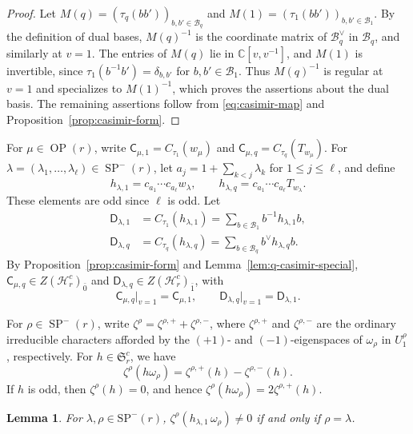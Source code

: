 \documentclass[11pt]{amsart}
\numberwithin{equation}{section}
\theoremstyle{plain}
\newtheorem{lem}[thm]{Lemma}
\theoremstyle{definition}
\theoremstyle{remark}
\begin{document}
\begin{proof}
Let $M(q)=(\tau_q(bb'))_{b,b'\in\mathcal B_q}$ and
$M(1)=(\tau_1(bb'))_{b,b'\in\mathcal B_1}$. By the definition of dual bases,
$M(q)^{-1}$ is the coordinate matrix of $\mathcal B_q^\vee$ in $\mathcal B_q$,
and similarly at $v=1$.
The entries of $M(q)$ lie in $\mathbb C[v,v^{-1}]$, and $M(1)$ is
invertible, since $\tau_1(b^{-1}b')=\delta_{b,b'}$
for $b,b'\in\mathcal B_1$.
Thus $M(q)^{-1}$ is regular at $v=1$ and specializes to
$M(1)^{-1}$, which proves the assertions about the dual basis.
The remaining assertions follow from \eqref{eq:casimir-map}
and Proposition~\ref{prop:casimir-form}.
\end{proof}


For $\mu\in\operatorname{OP}(r)$, write
$\mathsf{C}_{\mu,1}=C_{\tau_1}(w_\mu)$ and
$\mathsf{C}_{\mu,q}=C_{\tau_q}(T_{w_\mu})$. For $\lambda=(\lambda_1,\ldots,\lambda_\ell)
\in\operatorname{SP}^{-}(r)$, let
$a_j=1+\sum_{k<j}\lambda_k$ for $1\leq j\leq\ell$, and define
$$
h_{\lambda,1}=c_{a_1}\cdots c_{a_\ell}w_\lambda,
\qquad
h_{\lambda,q}=c_{a_1}\cdots c_{a_\ell}T_{w_\lambda}.
$$
These elements are odd since $\ell$ is odd.
Let
\begin{equation}\label{eq:q-odd-class-casimir}
\begin{aligned}
\mathsf D_{\lambda,1}
&=C_{\tau_1}(h_{\lambda,1})
=\sum_{b\in\mathcal B_1}b^{-1}h_{\lambda,1}b,\\
\mathsf D_{\lambda,q}
&=C_{\tau_q}(h_{\lambda,q})
=\sum_{b\in\mathcal B_q}b^\vee h_{\lambda,q}b.
\end{aligned}
\end{equation} By Proposition~\ref{prop:casimir-form} and
Lemma~\ref{lem:q-casimir-special},
$\mathsf C_{\mu,q}\in Z(\mathcal H_{r}^c)_{\bar0}$
and
$\mathsf D_{\lambda,q}\in Z(\mathcal H_{r}^c)_{\bar1}$,
with
$$
\mathsf C_{\mu,q}\big|_{v=1}=\mathsf C_{\mu,1},
\qquad
\mathsf D_{\lambda,q}\big|_{v=1}=\mathsf D_{\lambda,1}.
$$ 



For $\rho\in\operatorname{SP}^{-}(r)$, write $\zeta^\rho=\zeta^{\rho,+}+\zeta^{\rho,-}$, where $\zeta^{\rho,+}$ and $\zeta^{\rho,-}$ are the ordinary irreducible characters afforded by the $(+1)$- and
$(-1)$-eigenspaces of $\omega_\rho$ in $U_1^\rho$,
respectively.
For $h\in\mathfrak S_r^c$, we have
$$
\zeta^\rho(h\omega_\rho)
=
\zeta^{\rho,+}(h)-\zeta^{\rho,-}(h).
$$
If $h$ is odd, then $\zeta^\rho(h)=0$, and hence
$\zeta^\rho(h\omega_\rho)=2\zeta^{\rho,+}(h)$.

\begin{lem}\label{lem:q-odd-values}
For $\lambda,\rho\in\mathrm{SP}^-(r)$, $\zeta^\rho(h_{\lambda,1}\,\omega_\rho)\neq0$ if and only if $\rho=\lambda$.
\end{lem}
\end{document}
